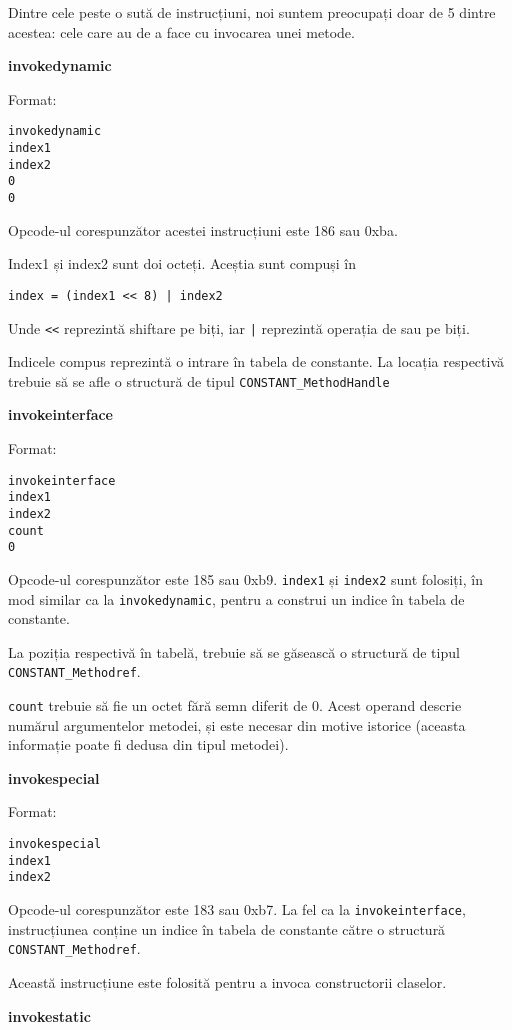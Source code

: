 Dintre cele peste o sută de instrucțiuni, noi suntem preocupați doar de
5 dintre acestea: cele care au de a face cu invocarea unei metode.

\textbf{invokedynamic}

Format:
\begin{verbatim}
invokedynamic
index1
index2
0
0
\end{verbatim}

Opcode-ul corespunzător acestei instrucțiuni este 186 sau
0xba.

Index1 și index2 sunt doi octeți. Aceștia sunt compuși în
\begin{lstlisting}
index = (index1 << 8) | index2
\end{lstlisting}
Unde \texttt{<<} reprezintă shiftare pe biți, iar \texttt{|}
reprezintă operația de sau pe biți.

Indicele compus reprezintă o intrare în tabela de constante. La locația
respectivă trebuie să se afle o structură de tipul
\texttt{CONSTANT\_MethodHandle}

\textbf{invokeinterface}

Format:
\begin{verbatim}
invokeinterface
index1
index2
count
0
\end{verbatim}

Opcode-ul corespunzător este 185 sau 0xb9.
\texttt{index1} și \texttt{index2} sunt folosiți, în mod similar ca la
\texttt{invokedynamic}, pentru a construi un indice în tabela
de constante.

La poziția respectivă în tabelă, trebuie să se găsească o structură de
tipul \texttt{CONSTANT\_Methodref}.

\texttt{count} trebuie să fie un octet fără semn diferit de 0. Acest
operand descrie numărul argumentelor metodei, și este necesar din motive
istorice (aceasta informație poate fi dedusa din tipul metodei).

\textbf{invokespecial}

Format:
\begin{verbatim}
invokespecial
index1
index2
\end{verbatim}

Opcode-ul corespunzător este 183 sau 0xb7. La fel ca la
\texttt{invokeinterface}, instrucțiunea conține un indice în tabela de constante
către o structură \texttt{CONSTANT\_Methodref}.

Această instrucțiune este folosită pentru a invoca constructorii
claselor.

\textbf{invokestatic}

